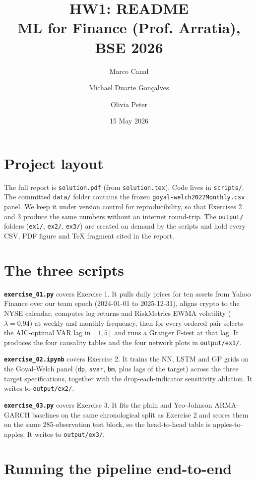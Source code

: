 \documentclass[11pt,a4paper]{article}
\title{\vspace{-1.5em}HW1:  README\\
       \large ML for Finance (Prof. Arratia), BSE 2026}
\author{Marco Canal \and Michael Duarte Gonçalves \and Olivia Peter}
\date{15 May 2026}
\newcommand{\code}[1]{\texttt{#1}}
\begin{document}
\maketitle

\section*{Project layout}

The full report is \code{solution.pdf} (from \code{solution.tex}). Code lives
in \code{scripts/}. The committed \code{data/} folder contains the frozen
\code{goyal-welch2022Monthly.csv} panel. We keep it under version control
for reproducibility, so that Exercises 2 and 3 produce the same numbers
without an internet round-trip. The \code{output/} folders (\code{ex1/},
\code{ex2/}, \code{ex3/}) are created on demand by the scripts and hold
every CSV, PDF figure and TeX fragment cited in the report.

\section*{The three scripts}

\textbf{\code{exercise\_01.py}} covers Exercise 1. It pulls daily prices
for ten assets from Yahoo Finance over our team epoch (2024-01-01 to
2025-12-31), aligns crypto to the NYSE calendar, computes log returns and
RiskMetrics EWMA volatility ($\lambda=0.94$) at weekly and monthly
frequency, then for every ordered pair selects the AIC-optimal VAR lag in
$[1,5]$ and runs a Granger F-test at that lag. It produces the four
causality tables and the four network plots in \code{output/ex1/}.

\textbf{\code{exercise\_02.ipynb}} covers Exercise 2. It trains the NN,
LSTM and GP grids on the Goyal-Welch panel (\code{dp}, \code{svar},
\code{bm}, plus lags of the target) across the three target specifications,
together with the drop-each-indicator sensitivity ablation. It writes to
\code{output/ex2/}.

\textbf{\code{exercise\_03.py}} covers Exercise 3. It fits the plain and
Yeo-Johnson ARMA-GARCH baselines on the same chronological split as
Exercise 2 and scores them on the same 285-observation test block, so the
head-to-head table is apples-to-apples. It writes to \code{output/ex3/}.

\section*{Running the pipeline end-to-end}
\end{document}
